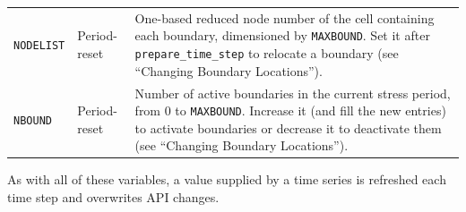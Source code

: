 \begin{longtable}{p{} p{} p{}}
\texttt{NODELIST} & Period-reset &
One-based reduced node number of the cell containing each boundary, dimensioned
by \texttt{MAXBOUND}. Set it after \texttt{prepare\_time\_step} to relocate a
boundary (see ``Changing Boundary Locations''). \\

\texttt{NBOUND} & Period-reset &
Number of active boundaries in the current stress period, from 0 to
\texttt{MAXBOUND}. Increase it (and fill the new entries) to activate boundaries
or decrease it to deactivate them (see ``Changing Boundary Locations''). \\

\hline
\end{longtable}

\noindent As with all of these variables, a value supplied by a time series is
refreshed each time step and overwrites API changes.
